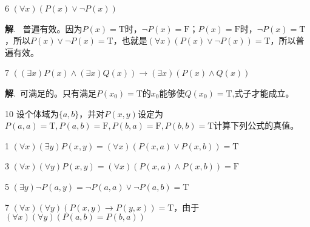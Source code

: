 \documentclass[12pt]{article}
\newenvironment{firstlayer}%
{\begin{list}{}{\renewcommand{\makelabel}[1]{\textbf{##1}.\hfil}
}}
{\end{list}}
\newenvironment{secondlayer}%
{\begin{list}{}{\renewcommand{\makelabel}[1]{(##1)\hfil}
}}
{\end{list}}
\providecommand{\sol}{\textbf{解}.~}
\begin{document}
\begin{CJK}{UTF8}{gbsn}
\begin{firstlayer}
\begin{secondlayer}
    \item[6]$(\forall x)(P(x)\vee \neg P(x))$
    
    \sol
普遍有效。因为$P(x)=\text{T}$时，$\neg P(x)=\text{F}$；$P(x)=\text{F}$时，$\neg P(x)=\text{T}$，所以$P(x)\vee \neg P(x)=\text{T}$，也就是$(\forall x)(P(x)\vee \neg P(x))=\text{T}$，所以普遍有效。
    \item[7]$((\exists x)P(x)\wedge(\exists x)Q(x))\rightarrow (\exists x)(P(x)\wedge Q(x))$
    
    \sol 可满足的。只有满足$P(x_0)=\text{T}$的$x_0$能够使$Q(x_0)=\text{T}$,式子才能成立。
  \end{secondlayer}
  \item[10]设个体域为$\{a,b\}$，并对$P(x,y)$设定为$P(a,a)=\text{T},P(a,b)=\text{F},P(b,a)=\text{F},P(b,b)=\text{T}$计算下列公式的真值。
  \begin{secondlayer}
    \item[1]$(\forall x)(\exists y)P(x,y)=(\forall x)(P(x,a)\vee P(x,b))=\text{T}$
    \item[3]$(\forall x)(\forall y)P(x,y)=(\forall x)(P(x,a)\wedge P(x,b))=\text{F}$
    \item[5]$(\exists y)\neg P(a,y)=\neg P(a,a)\vee\neg P(a,b)=\text{T}$
    \item[7]$(\forall x)(\forall y)(P(x,y)\rightarrow P(y,x))=\text{T}$，由于$(\forall x)(\forall y)(P(a,b)=P(b,a))$
  \end{secondlayer}
\end{firstlayer}


\end{CJK}
\end{document}

